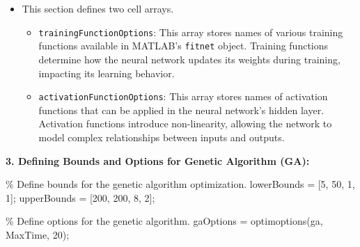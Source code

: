 \documentclass[
  super,
  review,
  3p]{elsarticle}
\newenvironment{Shaded}{\begin{snugshade}}{\end{snugshade}}
\newcommand{\CommentTok}[1]{\textcolor[rgb]{0.37,0.37,0.37}{#1}}
\newcommand{\FloatTok}[1]{\textcolor[rgb]{0.68,0.00,0.00}{#1}}
\newcommand{\NormalTok}[1]{\textcolor[rgb]{0.00,0.23,0.31}{#1}}
\newcommand{\OperatorTok}[1]{\textcolor[rgb]{0.37,0.37,0.37}{#1}}
\newcommand{\SpecialStringTok}[1]{\textcolor[rgb]{0.13,0.47,0.30}{#1}}
\newcommand{\VariableTok}[1]{\textcolor[rgb]{0.07,0.07,0.07}{#1}}
\providecommand{\tightlist}{%
  \setlength{\itemsep}{0pt}\setlength{\parskip}{0pt}}\usepackage{longtable,booktabs,array}
\begin{document}
\begin{itemize}
\tightlist
\item
  This section defines two cell arrays.

  \begin{itemize}
  \tightlist
  \item
    \texttt{trainingFunctionOptions}: This array stores names of various
    training functions available in MATLAB's \texttt{fitnet} object.
    Training functions determine how the neural network updates its
    weights during training, impacting its learning behavior.
  \item
    \texttt{activationFunctionOptions}: This array stores names of
    activation functions that can be applied in the neural network's
    hidden layer. Activation functions introduce non-linearity, allowing
    the network to model complex relationships between inputs and
    outputs.
  \end{itemize}
\end{itemize}

\textbf{3. Defining Bounds and Options for Genetic Algorithm (GA):}

\begin{Shaded}
\begin{Highlighting}[]
    \CommentTok{\% Define bounds for the genetic algorithm optimization.}
    \VariableTok{lowerBounds} \OperatorTok{=}\NormalTok{ [}\FloatTok{5}\OperatorTok{,} \FloatTok{50}\OperatorTok{,} \FloatTok{1}\OperatorTok{,} \FloatTok{1}\NormalTok{]}\OperatorTok{;}
    \VariableTok{upperBounds} \OperatorTok{=}\NormalTok{ [}\FloatTok{200}\OperatorTok{,} \FloatTok{200}\OperatorTok{,} \FloatTok{8}\OperatorTok{,} \FloatTok{2}\NormalTok{]}\OperatorTok{;}

    \CommentTok{\% Define options for the genetic algorithm.}
    \VariableTok{gaOptions} \OperatorTok{=} \VariableTok{optimoptions}\NormalTok{(}\SpecialStringTok{\textquotesingle{}ga\textquotesingle{}}\OperatorTok{,} \SpecialStringTok{\textquotesingle{}MaxTime\textquotesingle{}}\OperatorTok{,} \FloatTok{20}\NormalTok{)}\OperatorTok{;}
\end{Highlighting}
\end{Shaded}
\end{document}
